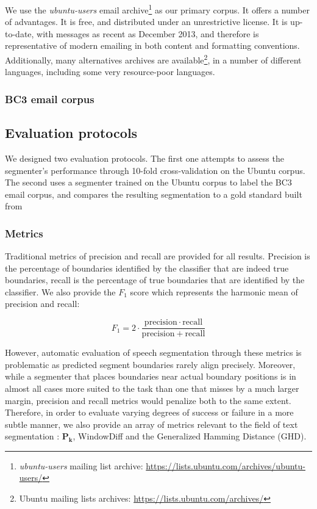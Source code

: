\documentclass[11pt]{article}
\begin{document}
We use the \textit{ubuntu-users} email archive\footnote{\textit{ubuntu-users} mailing list archive: \url{https://lists.ubuntu.com/archives/ubuntu-users/}} as our primary corpus. It offers a number of advantages. It is free, and distributed under an unrestrictive license. It is up-to-date, with messages as recent as December 2013, and therefore is representative of modern emailing in both content and formatting conventions. Additionally, many alternatives archives are available\footnote{Ubuntu mailing lists archives: \url{https://lists.ubuntu.com/archives/}}, in a number of different languages, including some very resource-poor languages.

\subsubsection{BC3 email corpus}


\subsection{Evaluation protocols}

We designed two evaluation protocols. The first one attempts to assess the segmenter's performance through 10-fold cross-validation on the Ubuntu corpus. The second uses a segmenter trained on the Ubuntu corpus to label the BC3 email corpus, and compares the resulting segmentation to a gold standard built  from

\subsubsection{Metrics}

Traditional metrics of precision and recall are provided for all results. Precision is the percentage of boundaries identified by the classifier that are indeed true boundaries, recall is the percentage of true boundaries that are identified by the classifier. We also provide the $F_1$ score which represents the harmonic mean of precision and recall:

\[
    F_1 = 2 \cdot \frac{\mathrm{precision} \cdot \mathrm{recall}}{\mathrm{precision} + \mathrm{recall}}
\]

However, automatic evaluation of speech segmentation through these metrics is problematic as predicted segment boundaries rarely align precisely. Moreover, while a segmenter that places boundaries near actual boundary positions is in almost all cases more suited to the task than one that misses by a much larger margin, precision and recall metrics would penalize both to the same extent. Therefore, in order to evaluate varying degrees of success or failure in a more subtle manner, we also provide an array of metrics relevant to the field of text segmentation : $\bm{P_{k}}$, WindowDiff and the Generalized Hamming Distance (GHD).
\end{document}
